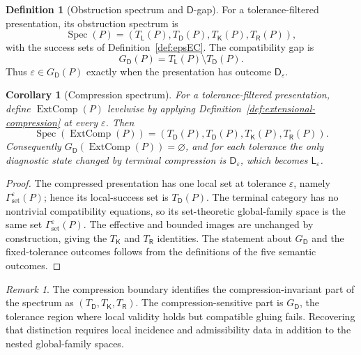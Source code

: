 \documentclass[11pt]{article}
\theoremstyle{plain}
\newtheorem{corollary}[theorem]{Corollary}
\theoremstyle{definition}
\newtheorem{definition}[theorem]{Definition}
\theoremstyle{remark}
\newtheorem{remark}[theorem]{Remark}
\newcommand{\eps}{\varepsilon}
\begin{document}
\begin{definition}[Obstruction spectrum and $\mathsf D$-gap]
\label{def:obstruction-spectrum}
For a tolerance-filtered presentation, its obstruction spectrum is
\[
\operatorname{Spec}(P)=
(T_{\mathsf L}(P),T_{\mathsf D}(P),T_{\mathsf K}(P),T_{\mathsf R}(P)),
\]
with the success sets of Definition~\ref{def:epsEC}. The compatibility gap is
\[
G_{\mathsf D}(P)=T_{\mathsf L}(P)\setminus T_{\mathsf D}(P).
\]
Thus $\eps\in G_{\mathsf D}(P)$ exactly when the presentation has outcome
$\mathsf D_\eps$.
\end{definition}

\begin{corollary}[Compression spectrum]
\label{cor:compression-spectrum}
For a tolerance-filtered presentation, define $\operatorname{ExtComp}(P)$
levelwise by applying Definition~\ref{def:extensional-compression} at every
$\eps$. Then
\[
\operatorname{Spec}(\operatorname{ExtComp}(P))=
(T_{\mathsf D}(P),T_{\mathsf D}(P),T_{\mathsf K}(P),T_{\mathsf R}(P)).
\]
Consequently $G_{\mathsf D}(\operatorname{ExtComp}(P))=\varnothing$, and for
each tolerance the only diagnostic state changed by terminal compression is
$\mathsf D_\eps$, which becomes $\mathsf L_\eps$.
\end{corollary}

\begin{proof}
The compressed presentation has one local set at tolerance $\eps$, namely
$\Gamma_{\mathrm{set}}^\eps(P)$; hence its local-success set is
$T_{\mathsf D}(P)$. The terminal category has no nontrivial compatibility
equations, so its set-theoretic global-family space is the same set
$\Gamma_{\mathrm{set}}^\eps(P)$. The effective and bounded images are unchanged
by construction, giving the $T_{\mathsf K}$ and $T_{\mathsf R}$ identities. The
statement about $G_{\mathsf D}$ and the fixed-tolerance outcomes follows from
the definitions of the five semantic outcomes.
\end{proof}

\begin{remark}
The compression boundary identifies the compression-invariant part of the
spectrum as $(T_{\mathsf D},T_{\mathsf K},T_{\mathsf R})$. The
compression-sensitive part is $G_{\mathsf D}$, the tolerance region where local
validity holds but compatible gluing fails. Recovering that distinction requires
local incidence and admissibility data in addition to the nested global-family
spaces.
\end{remark}
\end{document}
